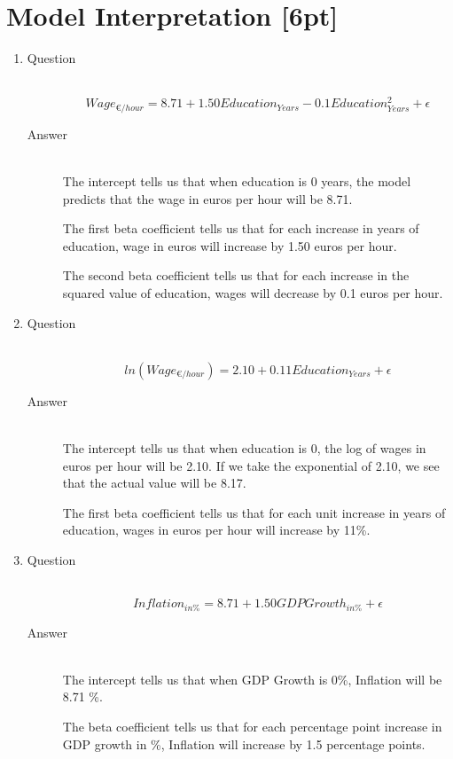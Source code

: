 \documentclass{article}
\begin{document}
\section{Model Interpretation [6pt]}
  
  \begin{enumerate}
    \item 
    \begin{description}
      \item[Question] \hfill \\
      \[Wage_{\euro/hour} = 8.71 + 1.50 Education_{Years} - 0.1 Education^2_{Years} + \epsilon\]
      \item[Answer] \hfill \\
      The intercept tells us that when education is 0 years, the model predicts that the wage in euros per hour will be 8.71.
      
      The first beta coefficient tells us that for each increase in years of education, wage in euros will increase by 1.50 euros per hour.
      
      The second beta coefficient tells us that for each increase in the squared value of education, wages will decrease by 0.1 euros per hour.
    \end{description}
  
    \item 
    \begin{description}
      \item[Question] \hfill \\
      \[ln(Wage_{\euro/hour}) = 2.10 + 0.11 Education_{Years} + \epsilon\]
      \item[Answer] \hfill \\
      The intercept tells us that when education is 0, the log of wages in euros per hour will be 2.10. If we take the exponential of 2.10, we see that the actual value will be 8.17.
      
      The first beta coefficient tells us that for each unit increase in years of education, wages in euros per hour will increase by 11\%.
    \end{description}
    
    \item 
    \begin{description}
      \item[Question] \hfill \\
      \[Inflation_{in \%} = 8.71 + 1.50 GDPGrowth_{in \%} + \epsilon \] 
      \item[Answer] \hfill \\
      The intercept tells us that when GDP Growth is 0\%, Inflation will be 8.71 \%.
      
      The beta coefficient tells us that for each percentage point increase in GDP growth in \%, Inflation will increase by 1.5 percentage points.
    \end{description}
  \end{enumerate}
\end{document}
